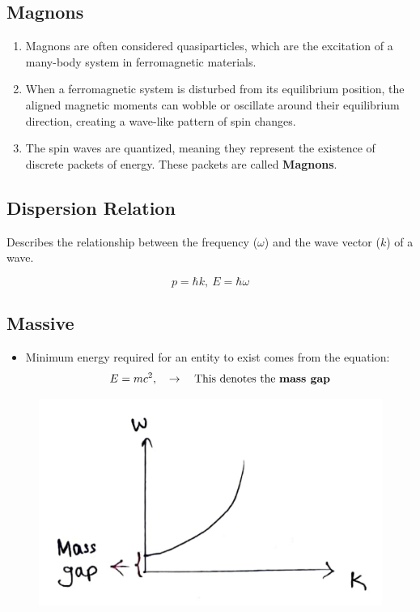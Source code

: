 \documentclass[14pt]{article} %
\begin{document}
\subsection*{Magnons}
\begin{enumerate}
    \item Magnons are often considered quasiparticles, which are the excitation of a many-body system in ferromagnetic materials.
    
    \item When a ferromagnetic system is disturbed from its equilibrium position, the aligned magnetic moments can wobble or oscillate around their equilibrium direction, creating a wave-like pattern of spin changes.
    
    \item The spin waves are quantized, meaning they represent the existence of discrete packets of energy. These packets are called \textbf{Magnons}.
\end{enumerate}

\subsection*{Dispersion Relation}
Describes the relationship between the frequency ($\omega$) and the wave vector ($k$) of a wave.

\[
\boxed{p = \hbar k,~ E = \hbar \omega}
\]

\subsection*{Massive}
\begin{itemize}
    \item Minimum energy required for an entity to exist comes from the equation:
    \[
    E = mc^2, \quad\rightarrow\quad\text{This denotes the \textbf{mass gap}}
    \]
\end{itemize}
\vspace{-1cm}
\begin{figure}[H]
\centering
\includegraphics[width=0.6\linewidth]{L(-2)_1.jpg}
\caption*{}
\end{figure}
\vspace{-1.5cm}
\end{document}
